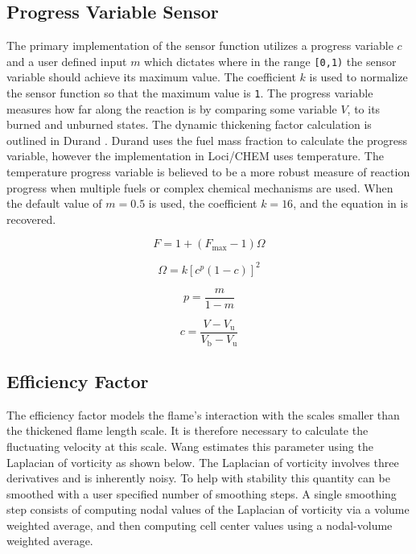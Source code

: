 \documentclass{article}
\begin{document}
\subsection{Progress Variable Sensor}\label{SUBSEC_PVS}
The primary implementation of the sensor function utilizes a progress variable {\tt $c$} and a user defined input {\tt $m$} which dictates where in the range {\tt [0,1)} the sensor variable should achieve its maximum value. The coefficient {\tt $k$} is used to normalize the sensor function so that the maximum value is {\tt 1}. The progress variable measures how far along the reaction is by comparing some variable {\tt $V$}, to its burned and unburned states. The dynamic thickening factor calculation is outlined in Durand \cite{Durand}. Durand uses the fuel mass fraction to calculate the progress variable, however the implementation in Loci/CHEM uses temperature. The temperature progress variable is believed to be a more robust measure of reaction progress when multiple fuels or complex chemical mechanisms are used. When the default value of {\tt $m=0.5$} is used, the coefficient {\tt $k=16$}, and the equation in \cite{Durand} is recovered.

\begin{equation}
F = 1 + \left( F_\mathrm{max} - 1\right) \Omega
\end{equation}

\begin{equation}
\Omega = k \left[ c^p \left( 1 - c\right) \right]^2
\end{equation}

\begin{equation}
p = \frac{m}{1 - m}
\end{equation}

\begin{equation}
c = \frac{V - V_\mathrm u}{V_\mathrm b - V_\mathrm u}
\end{equation}


\subsection{Efficiency Factor}

The efficiency factor models the flame's interaction with the scales smaller than the thickened flame length scale. It is therefore necessary to calculate the fluctuating velocity at this scale. Wang \cite{Wang} estimates this parameter using the Laplacian of vorticity as shown below. The Laplacian of vorticity involves three derivatives and is inherently noisy. To help with stability this quantity can be smoothed with a user specified number of smoothing steps. A single smoothing step consists of computing nodal values of the Laplacian of vorticity via a volume weighted average, and then computing cell center values using a nodal-volume weighted average.
\end{document}
